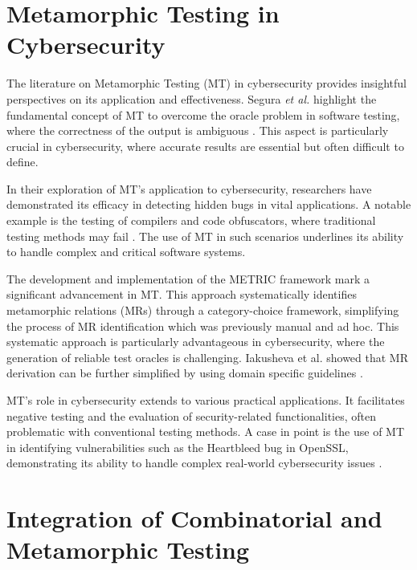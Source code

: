 \section{Metamorphic Testing in Cybersecurity}\label{sec:metamorphic-testing-in-cybersecurity}

The literature on Metamorphic Testing (MT) in cybersecurity provides insightful perspectives on its application and effectiveness. Segura \textit{et al.} highlight the fundamental concept of MT to overcome the oracle problem in software testing, where the correctness of the output is ambiguous \cite{CybersecurityMT}. This aspect is particularly crucial in cybersecurity, where accurate results are essential but often difficult to define.

In their exploration of MT's application to cybersecurity, researchers have demonstrated its efficacy in detecting hidden bugs in vital applications. A notable example is the testing of compilers and code obfuscators, where traditional testing methods may fail \cite{CybersecurityMT} \cite{GLSLFuzz}. The use of MT in such scenarios underlines its ability to handle complex and critical software systems.

The development and implementation of the METRIC framework \cite{ChenPoon2016} mark a significant advancement in MT. This approach systematically identifies metamorphic relations (MRs) through a category-choice framework, simplifying the process of MR identification which was previously manual and ad hoc. This systematic approach is particularly advantageous in cybersecurity, where the generation of reliable test oracles is challenging. Iakusheva et al. showed that MR derivation can be further simplified by using domain specific guidelines \cite{MetaRU}.

MT's role in cybersecurity extends to various practical applications.
It facilitates negative testing and the evaluation of security-related functionalities, often problematic with conventional testing methods. A case in point is the use of MT in identifying vulnerabilities such as the Heartbleed bug in OpenSSL, demonstrating its ability to handle complex real-world cybersecurity issues \cite{OpenSSLMT}.


\section{Integration of Combinatorial and Metamorphic Testing}\label{sec:integration-of-combinatorial-and-metamorphic-testing}

